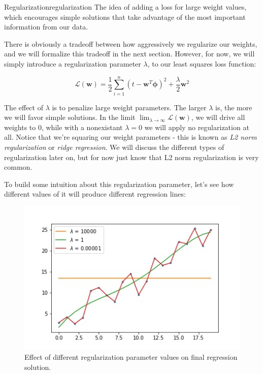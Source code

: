 \begin{definition}{Regularization}{regularization}
    The idea of adding a loss for large weight values, which encourages simple solutions that take advantage of the most important information from our data.
\end{definition}

There is obviously a tradeoff between how aggressively we regularize our weights, and we will formalize this tradeoff in the next section. However, for now, we will simply introduce a regularization parameter $\lambda$, to our least squares loss function:

\begin{equation} \label{least-squares-loss-fn-w-regularization}
    \mathcal{L}(\textbf{w}) = \frac{1}{2} \sum_{i=1}^{n} (t - \textbf{w}^{T}\boldsymbol{\phi})^2 + \frac{\lambda}{2}\textbf{w}^{2}
\end{equation}

The effect of $\lambda$ is to penalize large weight parameters. The larger $\lambda$ is, the more we will favor simple solutions. In the limit $\lim_{\lambda\to\infty} \mathcal{L}(\textbf{w})$, we will drive all weights to 0, while with a nonexistant $\lambda = 0$ we will apply no regularization at all. Notice that we're squaring our weight parameters - this is known as \textit{L2 norm regularization} or \textit{ridge regression}. We will discuss the different types of regularization later on, but for now just know that L2 norm regularization is very common.

To build some intuition about this regularization parameter, let's see how different values of it will produce different regression lines:

\begin{figure}
    \centering
    \includegraphics[width=0.5\paperwidth]{../LinearRegression/fig/diffregvalues_GEN.jpg}
    \caption{Effect of different regularization parameter values on final regression solution.}
    \label{fig:ridge-reg-diff-values}
\end{figure}

